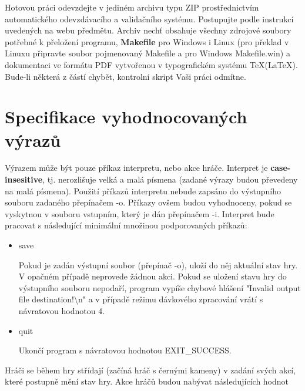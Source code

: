 \documentclass[
12pt,
a4paper,
pdftex,
czech,
titlepage
]{report}
\begin{document}
Hotovou práci odevzdejte v jediném archivu typu ZIP prostřednictvím automatického odevzdávacího a validačního systému. Postupujte podle instrukcí uvedených na webu předmětu. Archiv nechť
obsahuje všechny zdrojové soubory potřebné k přeložení programu, \textbf{Makefile} pro Windows i Linux
(pro překlad v Linuxu připravte soubor pojmenovaný Makefile a pro Windows Makefile.win)
a dokumentaci ve formátu PDF vytvořenou v typografickém systému \TeX (\LaTeX). Bude-li některá
z částí chybět, kontrolní skript Vaši práci odmítne.

\section*{Specifikace vyhodnocovaných výrazů
}
Výrazem může být pouze příkaz interpretu, nebo akce hráče. Interpret je \textbf{case-insesitive}, tj. nerozlišuje velká a malá písmena (zadané výrazy budou převedeny na malá písmena).
\newline\newline
Použití příkazů interpretu nebude zapsáno do výstupního souboru zadaného přepínačem -o. Příkazy ovšem budou vyhodnoceny, pokud se vyskytnou v souboru vstupním, který je dán přepínačem
-i. Interpret bude pracovat s následující minimální množinou podporovaných příkazů:
\begin{itemize}[label={}]
\item save
\hspace{0.5cm} \begin{minipage}[t]{0.8\textwidth}  Pokud je zadán výstupní soubor (přepínač -o), uloží do něj aktuální stav hry. V opačném případě neprovede žádnou akci. Pokud se uložení stavu hry do výstupního souboru
nepodaří, program vypíše chybové hlášení "Invalid output file destination!\textbackslash n"
a v případě režimu dávkového zpracování vrátí s návratovou hodnotou 4.
\end{minipage}

\item quit
\hspace{0.5cm} \begin{minipage}[t]{0.8\textwidth} Ukončí program s návratovou hodnotou EXIT\_SUCCESS.
\end{minipage}
\end{itemize}
Hráči se během hry střídají (začíná hráč s černými kameny) v zadání svých akcí, které postupně
mění stav hry. Akce hráčů budou nabývat následujících hodnot
\end{document}
